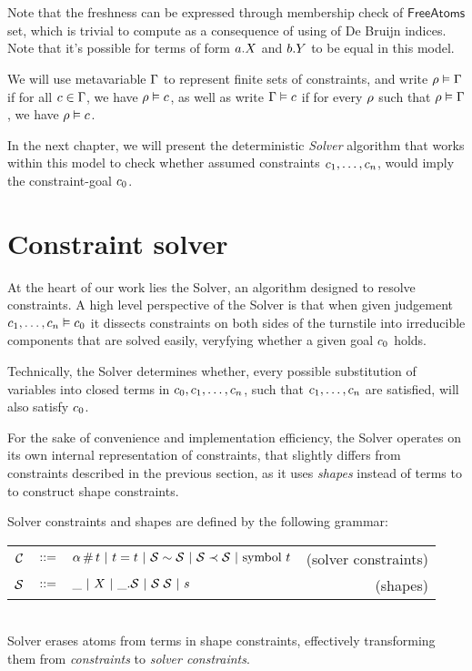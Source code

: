 \documentclass[english, mgr]{iithesis}
\renewcommand{\it}[1]{\textit{#1}}
\begin{document}
\\ \\
Note that the freshness can be expressed through membership check of $\mathsf{FreeAtoms}$ set,
which is trivial to compute as a consequence of using of De Bruijn indices.
Note that  it's possible for terms of form $a.{X}$ and $b.{Y}$
to be equal in this model.

We will use metavariable $\Gamma$ to represent finite sets of constraints,
and write $\rho \vDash \Gamma$ if for all $c \in \Gamma$,
we have $\rho \vDash c$,
as well as write $\Gamma \vDash c$ if for every $\rho$ such that $\rho \vDash \Gamma$,
we have $\rho \vDash c$.

In the next chapter, we will present the deterministic \it{Solver} algorithm
that works within this model to check whether assumed constraints $c_1, \ldots, c_n$,
would imply the constraint-goal $c_0$.

\chapter{Constraint solver}
At the heart of our work lies the Solver, an algorithm designed to resolve constraints.
A high level perspective of the Solver is that when given judgement $c_1, \ldots, c_n \vDash c_0$ it dissects constraints on both sides of the turnstile into irreducible components that are solved easily, veryfying  whether a given goal $c_0$ holds.

Technically, the Solver determines whether,
every possible substitution of variables into closed terms in $c_0, c_1, \dots, c_n$,
such that $c_1, \dots, c_n$ are satisfied, will also satisfy $c_0$.

For the sake of convenience and implementation efficiency, the Solver operates
on its own internal representation of constraints, that slightly differs from
constraints described in the previous section,
as it uses \it{shapes} instead of terms to to construct shape constraints.

Solver constraints and shapes are defined by the following grammar: \\
\begin{tabular}{rclr}
  $\mathcal{C}$ & $::=$ & $\alpha \,\#\, t
  \ |\  t = t
  \ |\  \mathcal{S} \sim \mathcal{S}
  \ |\  \mathcal{S} \prec \mathcal{S}
  \ |\  \text{symbol } t$
      & (solver constraints) \\
  $\mathcal{S}$      & $::=$ & $\_
                 \ |\   X
                 \ |\  \_. \mathcal{S}
                 \ |\  \mathcal{S} \; \mathcal{S}
                 \ |\  s$
      & (shapes)
\end{tabular}\\
Solver erases atoms from terms in shape constraints,
effectively transforming them from \it{constraints} to \it{solver constraints}.
\end{document}
